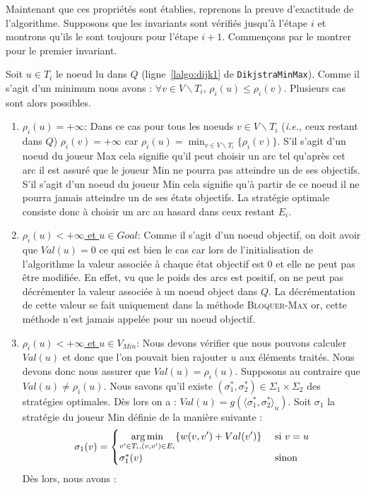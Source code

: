 Maintenant que ces propriétés sont établies, reprenons la preuve d'exactitude de l'algorithme. Supposons que les invariants sont vérifiés jusqu'à l'étape $i$ et montrons qu'ils le sont toujours pour l'étape $i+1$.
Commençons par le montrer pour le premier invariant.

Soit $u \in T_i$ le noeud lu dans $Q$ (ligne~\ref{lalgo:dijk1} de \verb|DikjstraMinMax|). Comme il s'agit d'un minimum nous avons : $\forall v \in V\backslash T_i,\, \rho_i(u) \leq \rho_i(v)$. Plusieurs cas sont alors possibles. 

\begin{enumerate}
	\item \underline{$\rho_i(u) = +\infty$}: Dans ce cas pour tous les noeuds $v \in V\backslash  T_i $ (\emph{i.e.,} ceux restant dans $Q$) $\rho_i(v) = + \infty$ car $\rho_i(u) = \min _{v \in V\backslash T_i } \{\rho_i(v)\}$. S'il s'agit d'un noeud du joueur Max cela signifie qu'il peut choisir un arc tel qu'après cet arc il est assuré que le joueur Min ne pourra pas atteindre un de ses objectifs. S'il s'agit d'un noeud du joueur Min cela signifie qu'à partir de ce noeud il ne pourra jamais atteindre un de ses états objectifs. La stratégie optimale consiste donc à choisir un arc au hasard dans ceux restant $E_i$.
	\item\underline{$\rho_i(u) < +\infty$ et $u \in Goal$}: Comme il s'agit d'un noeud objectif, on doit avoir que $Val(u) = 0$ ce qui est bien le cas car lors de l'initialisation de l'algorithme la valeur associée à chaque état objectif est 0 et elle ne peut pas être modifiée. En effet, vu que le poids des arcs est positif, on ne peut pas décrémenter la valeur associée à un noeud object dans $Q$. La décrémentation de cette valeur se fait uniquement dans la méthode \textsc{Bloquer-Max} or, cette méthode n'est jamais appelée pour un noeud objectif.
	
	\item\underline{$\rho_i(u) < +\infty$ et $u \in V_{Min}$}: Nous devons vérifier que nous pouvons calculer $Val(u)$ et donc que l'on pouvait bien rajouter $u$ aux éléments traités. Nous devons donc nous assurer que $Val(u) = \rho_i(u)$.
	Supposons au contraire que $Val(u) \neq \rho_i(u)$. Nous savons qu'il existe $(\sigma_1^*,\sigma_2^*) \in \Sigma_1 \times \Sigma_2 $ des stratégies optimales. Dès lors on a : $Val(u) = g(\langle \sigma_1^*, \sigma_2^* \rangle_u)$. Soit $\sigma_1$ la stratégie du joueur Min définie de la manière suivante : $$  \sigma_1(v) = \begin{cases}
											\displaystyle	\operatorname*{arg\,min}_{v'\in T_i,(v,v')\in E_i} \{ w(v,v') + Val(v') \} & \text{ si } v = u\\
												\sigma_1^*(v) &\text{ sinon} \end{cases}$$
Dès lors, nous avons : 


\end{enumerate}
